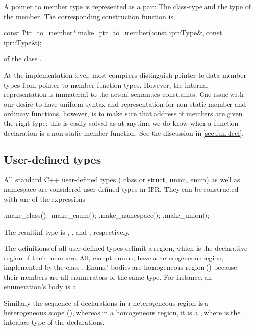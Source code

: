 \documentclass[11pt]{article}
\begin{document}
A pointer to member type is represented as a pair: The class-type and the type
of the member.  The corresponding construction function is
\begin{Program}
  const Ptr_to_member* make_ptr_to_member(const ipr::Type&,
                                          const ipr::Type&);
\end{Program}
of the class .

At the implementation level, most compilers distinguish pointer to data
member types from pointer to member function types. However, the internal
representation is immaterial to the actual semantics constraints. One issue
with our desire to have uniform syntax and representation for non-static
member and ordinary functions, however, is to make sure that address of
members are given the right type:  this is easily solved as at anytime we do
know when a function declaration is a non-static member function.  See the
discussion in \ref{sec:fun-decl}.


\subsection{User-defined types}
\label{sec:type.udt}

All standard C++ user-defined types (\eg{} class or struct, union, enum)
as well as namespace are considered user-defined types in IPR.  They can be
constructed with one of the expressions
\begin{Program}
  .make_class();
  .make_enum();
  .make_namespace();
  .make_union();
\end{Program}
The resultinf type is , , 
 and , respectively.

The definitions of all user-defined types delimit a region, which is the
declarative region of their members.  All, except enums, have a heterogeneous 
region, implemented by the class .
Enums' bodies are homogeneous region ()
because their members are all enumerators of the same type.  For instance, an
enumeration's body is a 


Similarly  the sequence of declarations in a heterogeneous region is a 
heterogeneous scope (), whereas in a homogeneous region,
it is a , where  is the interface 
type of the declarations.  
\end{document}

